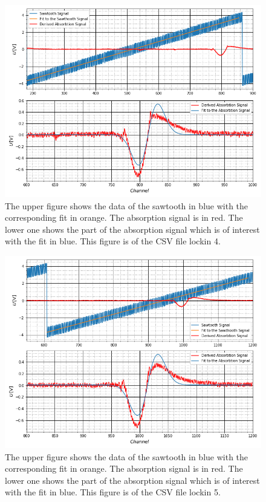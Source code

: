 	\begin{figure}[ht]
		\includegraphics[scale=0.5]{Bild/LockIn4.png}
		\centering
		\caption[Plots and Fits of Lock-In Method 4]{\small The upper figure shows the data of the sawtooth in blue with the corresponding fit in orange. The absorption signal is in red. The lower one shows the part of the absorption signal which is of interest with the fit in blue. This figure is of the CSV file lockin 4.}
		\label{Lock4}
	\end{figure}
	\begin{figure}[ht]
		\includegraphics[scale=0.5]{Bild/LockIn5.png}
		\centering
		\caption[Plots and Fits of Lock-In Method 5]{\small The upper figure shows the data of the sawtooth in blue with the corresponding fit in orange. The absorption signal is in red. The lower one shows the part of the absorption signal which is of interest with the fit in blue. This figure is of the CSV file lockin 5.}
		\label{Lock5}
	\end{figure}
